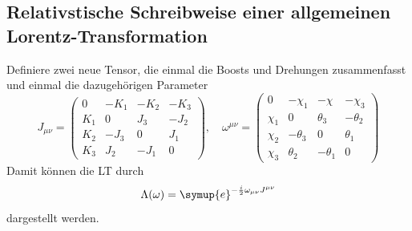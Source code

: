 \documentclass[
  captions=tableheading,  %
  titlepage=firstiscover, %
]{scrartcl}
\begin{document}
\subsection{Relativstische Schreibweise einer allgemeinen Lorentz-Transformation}
Definiere zwei neue Tensor, die einmal die Boosts und Drehungen zusammenfasst und einmal 
die dazugehörigen Parameter
\begin{equation*}
  J_{\mu \nu} = 
  \begin{pmatrix}
    0   & -K_1  & -K_2& -K_3  \\
    K_1 & 0     & J_3 & -J_2  \\
    K_2 & -J_3  & 0   & J_1   \\
    K_3 & J_2   & -J_1 & 0  
  \end{pmatrix}, \quad 
  \omega^{\mu \nu} = 
  \begin{pmatrix}
    0   & -\chi_1       & -  \chi   & -\chi_3  \\
    \chi_1 & 0          & \theta_3  & - \theta_2  \\
    \chi_2 & -\theta_3  & 0         &   \theta_1   \\
    \chi_3 &  \theta_2  & -\theta_1  & 0  
  \end{pmatrix}
\end{equation*}
Damit können die LT durch 
\begin{equation*}
  \Lambda(\omega) = \symup{e}^{-\frac{i}{2} \omega_{\mu \nu} J^{\mu \nu}}
\end{equation*}
dargestellt werden.
\end{document}
